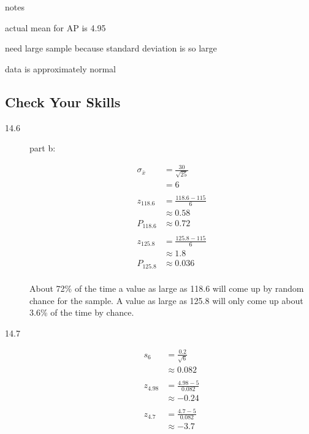 \documentclass[landscape]{exam}
\begin{document}
  notes
  \begin{itemize*}
    \item actual mean for AP is 4.95
    \item need large sample because standard deviation is so large
    \item data is approximately normal
  \end{itemize*}

  \subsection{Check Your Skills}
  \begin{description}
    \item[14.6]

      part b:

      \begin{align*}
        \sigma_{\bar{x}} & = \frac{30}{\sqrt{25}} \\
                         & = 6 \\
        \\
        z_{118.6}        & = \frac{118.6 - 115}{6} \\
                         & \approx 0.58 \\
        P_{118.6}        & \approx 0.72 \\
        \\
        z_{125.8}        & = \frac{125.8 - 115}{6} \\
                         & \approx 1.8 \\
        P_{125.8}        & \approx 0.036 \\
      \end{align*}

      About 72\% of the time a value as large as 118.6 will come up by random
      chance for the sample. A value as large as 125.8 will only come up about
      3.6\% of the time by chance.

    \item[14.7]
      \begin{align*}
        s_6 &= \frac{0.2}{\sqrt{6}} \\
        &\approx 0.082 \\
        \\
        z_{4.98} & = \frac{4.98 - 5}{0.082} \\
                 & \approx -0.24 \\
        \\
        z_{4.7} & = \frac{4.7 - 5}{0.082} \\
                & \approx -3.7 \\
      \end{align*}
  \end{description}
\end{document}

